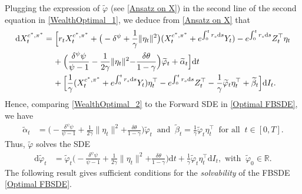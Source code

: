 \documentclass[12,reqno]{amsart}
\numberwithin{equation}{section}
\begin{document}
Plugging the expression of $\widetilde{\varphi}$ (see \eqref{Ansatz on X}) in the second line of the second equation in \eqref{WealthOptimal_1}, we deduce from \eqref{Ansatz on X} that
\begin{align}\label{WealthOptimal_2}
	\mathrm{d}X_{t}^{c^{*},\pi^{*}}&=\Big[r_{t}X_{t}^{c^{*},\pi^{*}}+\big(-\delta^{\psi}+\frac{1}{\gamma}\|\eta_{t}\|^{2}\big)(X_{t}^{c^{*},\pi^{*}}+e^{\int_{0}^{t}r_{s}\mathrm{d}s}Y_{t})-e^{\int_{0}^{t}r_{s}\mathrm{d}s}Z_{t}^{\top} \eta_{t}\notag\\
	&\phantom{xx}+\Big(\frac{\delta^{\psi}\psi}{\psi-1}-\frac{1}{2\gamma}\|\eta_{t}\|^{2}{-\frac{\delta\theta}{1-\gamma}}\Big)\widetilde{\varphi}_{t}+\widetilde{\alpha}_{t}\Big]\mathrm{d}t\notag\\
	&\phantom{xx}+\Big[\frac{1}{\gamma}(X_{t}^{c^{*},\pi^{*}}+e^{\int_{0}^{t}r_{s}\mathrm{d}s}Y_{t})\eta_{t}^{\top}-e^{\int_{0}^{t}r_{s}\mathrm{d}s}Z_{t}^{\top}-\frac{1}{\gamma}\widetilde{\varphi}_{t}\eta_{t}^{\top}+\widetilde{\beta}_{t}\Big]\mathrm{d}I_{t}.
\end{align}
Hence, comparing \eqref{WealthOptimal_2} to the Forward SDE in \eqref{Optimal FBSDE}, we have
\begin{align}
	\widetilde{\alpha}_{t}&=\Big(-\frac{\delta^{\psi}\psi}{\psi-1}+\frac{1}{2\gamma}\|\eta_{t}\|^{2}{+\frac{\delta\theta}{1-\gamma}}\Big)\widetilde{\varphi}_{t}~\text{ and }~
	\widetilde{\beta}_{t}=\frac{1}{\gamma}\widetilde{\varphi}_{t}\eta_{t}^{\top}~\text{ for all } ~t\in[0,T].
\end{align}
Thus, $\widetilde{\varphi}$ solves the SDE
\begin{align}\label{Dynamics of the auxiliary process_1}
	\mathrm{d}\widetilde{\varphi}_{t}&=\widetilde{\varphi}_{t}\Big(-\frac{\delta^{\psi}\psi}{\psi-1}+\frac{1}{2\gamma}\|\eta_{t}\|^{2}{+\frac{\delta\theta}{1-\gamma}}\Big)\mathrm{d}t+\frac{1}{\gamma}\widetilde{\varphi}_{t} \eta_{t}^{\top}\mathrm{d}I_{t},\text{ with }~\widetilde{\varphi}_{0}\in\mathbb{R}.
\end{align}
The following result gives sufficient conditions for the \textit{solvability} of the FBSDE \eqref{Optimal FBSDE}.
\end{document}

